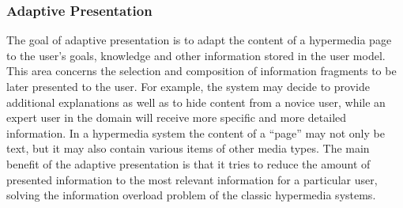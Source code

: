 \documentclass[12pt,a4paper,final,twoside,onecolumn,titlepage]{book}
\begin{document}
\subsubsection{Adaptive Presentation}
The goal of adaptive presentation is to adapt the content of a hypermedia page to the user’s goals, knowledge and other information stored in the user model. This area concerns the selection and composition of information fragments to be later presented to the user. For example, the system may decide to provide additional explanations as well as to hide content from a novice user, while an expert user in the domain will receive more specific and more detailed information. In a hypermedia system the content of a “page” may not only be text, but it may also contain various items of other media types. The main benefit of the adaptive presentation is that it tries to reduce the amount of presented information to the most relevant information for a particular user, solving the information overload problem of the classic hypermedia systems.
\end{document}
